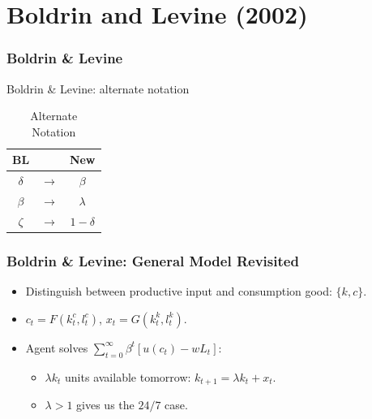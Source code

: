 \documentclass{beamer}
\begin{document}
\section{Boldrin and Levine (2002)}
\label{sec:boldrin_and_levine_2002}

\begin{frame}
  \frametitle{Boldrin \& Levine}
  Boldrin \& Levine: alternate notation\\
  \begin{table}[ht]
    \caption{Alternate Notation}
    \centering
  \begin{tabular}{c c c}
    \hline\hline
      BL &  & New\\ [0.5ex] 
    \hline
    $\delta$ & $\longrightarrow$ & $\beta$  \\ 
    $\beta$ & $\longrightarrow$ & $\lambda$ \\
    $\zeta$ & $\longrightarrow$ & $1 - \delta$ \\[1ex] 
    \hline
   \end{tabular}
   \label{table:altnot}
  \end{table}
\end{frame}

\begin{frame}[t]
  \frametitle{Boldrin \& Levine: General Model Revisited}
  \begin{itemize}
    \item<+-> Distinguish between productive input and consumption good: $\{k,c\}$.
    \item<+-> $c_t = F(k_t^c,l_t^c)$, $x_t = G(k_t^k,l_t^k)$.
    \item<+-> Agent solves $\sum_{t=0}^\infty\beta^t[u(c_t)-wL_t]$:
    \begin{itemize}
        \item<+-> $\lambda k_t$ units available tomorrow: $k_{t+1} = \lambda k_t + x_t$.
        \item<+-> $\lambda > 1$ gives us the $24/7$ case.
    \end{itemize}
  \end{itemize}
\end{frame}
\end{document}
